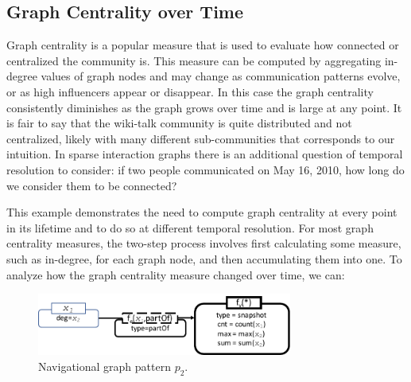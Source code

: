 \subsection{ Graph Centrality over Time} 

Graph centrality is a popular measure that is used to evaluate how
connected or centralized the community is.  This measure can be
computed by aggregating in-degree values of graph nodes and may change
as communication patterns evolve, or as high influencers appear or
disappear.  In this case the graph centrality consistently diminishes
as the graph grows over time and is large at any point.  It is fair to
say that the wiki-talk community is quite distributed and not
centralized, likely with many different sub-communities that
corresponds to our intuition.  In sparse interaction graphs there is
an additional question of temporal resolution to consider: if two
people communicated on May 16, 2010, how long do we consider them to
be connected?

This example demonstrates the need to compute graph centrality at
every point in its lifetime and to do so at different temporal
resolution.  For most graph centrality measures, the two-step process
involves first calculating some measure, such as in-degree, for each
graph node, and then accumulating them into one.  
To analyze how the graph centrality measure changed over time, we can:

\begin{figure}
\centering
\includegraphics[width=3.3in]{figs/snapshotncr.pdf}
\caption{Navigational graph pattern $p_2$.}
\vspace{-0.2cm}
\label{fig:snapshotncr}
\vspace{-0.2cm}
\end{figure}

